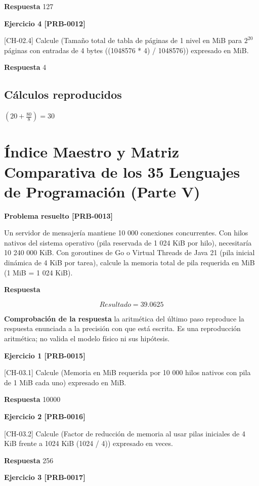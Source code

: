 \documentclass{book}
\begin{document}
\noindent\textbf{Respuesta} 127

\noindent\textbf{Ejercicio 4 [PRB-0012]}

[CH-02.4] Calcule (Tamaño total de tabla de páginas de 1 nivel en MiB para \(2^20\) páginas con entradas de 4 bytes ((1048576 * 4) / 1048576)) expresado en MiB.

\noindent\textbf{Respuesta} 4

\subsection*{Cálculos reproducidos}

\(\left(20+\frac{80}{8}\right) = 30\)

\section{Índice Maestro y Matriz Comparativa de los 35 Lenguajes de Programación (Parte V)}

\noindent\textbf{Problema resuelto [PRB-0013]}

Un servidor de mensajería mantiene 10 000 conexiones concurrentes. Con hilos nativos del sistema operativo (pila reservada de 1 024 KiB por hilo), necesitaría 10 240 000 KiB. Con goroutines de Go o Virtual Threads de Java 21 (pila inicial dinámica de 4 KiB por tarea), calcule la memoria total de pila requerida en MiB (1 MiB = 1 024 KiB).

\noindent\textbf{Respuesta}

\[
Resultado = 39.0625
\]

\noindent\textbf{Comprobación de la respuesta} la aritmética del último paso reproduce la respuesta enunciada a la precisión con que está escrita. Es una reproducción aritmética; no valida el modelo físico ni sus hipótesis.

\noindent\textbf{Ejercicio 1 [PRB-0015]}

[CH-03.1] Calcule (Memoria en MiB requerida por 10 000 hilos nativos con pila de 1 MiB cada uno) expresado en MiB.

\noindent\textbf{Respuesta} 10000

\noindent\textbf{Ejercicio 2 [PRB-0016]}

[CH-03.2] Calcule (Factor de reducción de memoria al usar pilas iniciales de 4 KiB frente a 1024 KiB (1024 / 4)) expresado en veces.

\noindent\textbf{Respuesta} 256

\noindent\textbf{Ejercicio 3 [PRB-0017]}
\end{document}
